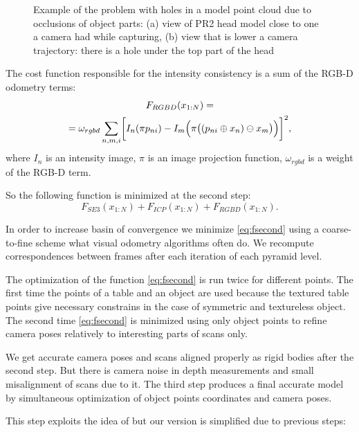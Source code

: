 \documentclass[letterpaper, 10 pt, conference]{ieeeconf}  %
\begin{document}
\begin{figure}[t]
\begin{subfigure}[b]{0.45\linewidth}
                \caption{}
        \end{subfigure}
        \caption{Example of the problem with holes in a model point cloud 
        due to occlusions of object parts:
        (a) view of PR2 head model close to one a camera had while capturing,
        (b) view that is lower a camera trajectory: there is a hole under 
        the top part of the head}
        \label{fig:pr2}
\end{figure}

The cost function responsible for the intensity consistency is
a sum of the RGB-D odometry terms:
\begin{multline} \label{eq:frgbd}
F_{RGBD}(x_{1:N}) = \\
= \omega_{rgbd} \sum_{n,m,i} \biggl[I_n(\pi p_{ni}) - I_m\Bigl(\pi \bigl((p_{ni} \oplus x_n) \ominus x_m\bigr)\Bigr) \biggr]^2,
\end{multline}
where $I_n$ is an intensity image, $\pi$ is an image projection function, $\omega_{rgbd}$
is a weight of the RGB-D term.

So the following function is minimized at the second step:
\begin{equation} \label{eq:fsecond}
F_{SE3}(x_{1:N}) + F_{ICP}(x_{1:N}) + F_{RGBD}(x_{1:N}).
\end{equation}

In order to increase basin of convergence 
we minimize \eqref{eq:fsecond} using a coarse-to-fine scheme 
what visual odometry algorithms often do. 
We recompute correspondences between frames
after each iteration of each pyramid level.

The optimization of the function \eqref{eq:fsecond} is run 
twice for different points. The first time the points of a table and an object are used  because 
the textured table points give necessary constrains in the case of symmetric and textureless object.
The second time \eqref{eq:fsecond} is minimized using only object points to refine 
camera poses relatively to interesting parts of scans only.

We get accurate camera poses and scans aligned properly 
as rigid bodies after the second step. But there is camera noise in depth measurements and small 
misalignment of scans due to it. The third step produces a final accurate model by
simultaneous optimization of object points coordinates and camera poses.

This step exploits the idea of \cite{ruhnke2012highly} but our version 
is simplified due to previous steps: 
\end{document}
